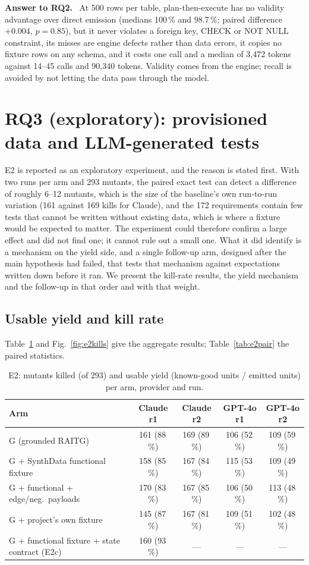 \documentclass[preprint,12pt]{elsarticle}
\newenvironment{answer}[1]{\begin{framed}\noindent\textbf{#1.}\ }{\end{framed}}
\begin{document}
\begin{answer}{Answer to RQ2}
At 500 rows per table, plan-then-execute has no validity advantage over direct emission (medians 100\,\% and 98.7\,\%; paired difference $+0.004$, $p=0.85$), but it never violates a foreign key, CHECK or NOT NULL constraint, its misses are engine defects rather than data errors, it copies no fixture rows on any schema, and it costs one call and a median of 3,472 tokens against 14--45 calls and 90,340 tokens. Validity comes from the engine; recall is avoided by not letting the data pass through the model.
\end{answer}

\section{RQ3 (exploratory): provisioned data and LLM-generated tests}
\label{sec:rq3}
E2 is reported as an exploratory experiment, and the reason is stated first. With two runs per arm and 293 mutants, the paired exact test can detect a difference of roughly 6--12 mutants, which is the size of the baseline's own run-to-run variation (161 against 169 kills for Claude), and the 172 requirements contain few tests that cannot be written without existing data, which is where a fixture would be expected to matter. The experiment could therefore confirm a large effect and did not find one; it cannot rule out a small one. What it did identify is a mechanism on the yield side, and a single follow-up arm, designed after the main hypothesis had failed, that tests that mechanism against expectations written down before it ran. We present the kill-rate results, the yield mechanism and the follow-up in that order and with that weight.


\subsection{Usable yield and kill rate}
Table~\ref{tab:e2} and Fig.~\ref{fig:e2kills} give the aggregate results; Table~\ref{tab:e2pair} the paired statistics.

\begin{table}[t]
\centering\footnotesize\setlength{\tabcolsep}{4pt}
\caption{E2: mutants killed (of 293) and usable yield (known-good units / emitted units) per arm, provider and run.}
\label{tab:e2}
\begin{tabular}{lcccc}
\toprule
Arm & Claude r1 & Claude r2 & GPT-4o r1 & GPT-4o r2 \\
\midrule
G (grounded RAITG) & 161 (88\,\%) & 169 (89\,\%) & 106 (52\,\%) & 109 (59\,\%) \\
G + SynthData functional fixture & 158 (85\,\%) & 167 (84\,\%) & 115 (53\,\%) & 109 (49\,\%) \\
G + functional + edge/neg.\ payloads & 170 (83\,\%) & 167 (85\,\%) & 106 (50\,\%) & 113 (48\,\%) \\
G + project's own fixture & 145 (87\,\%) & 167 (81\,\%) & 109 (51\,\%) & 102 (48\,\%) \\
G + functional fixture + state contract (E2c) & 160 (93\,\%) & --- & --- & --- \\
\bottomrule
\end{tabular}
\end{table}
\end{document}
